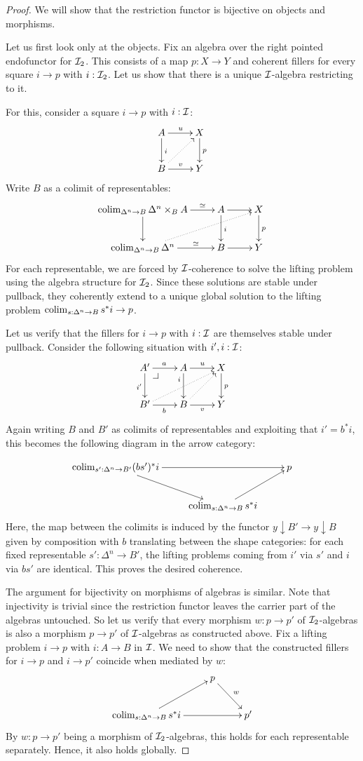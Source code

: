 \documentclass[reqno,10pt,a4paper,oneside]{amsart}
\begin{document}
\begin{proof}
We will show that the restriction functor is bijective on objects and morphisms.

Let us first look only at the objects.
Fix an algebra over the right pointed endofunctor for $\cal{I}_2$.
This consists of a map $p : X \to Y$ and coherent fillers for every square $i \to p$ with $i : \cal{I}_2$.
Let us show that there is a unique $\cal{I}$-algebra restricting to it.

For this, consider a square $i \to p$ with $i : \cal{I}$:
\[
\xymatrix{
  A
  \ar[r]^{u}
  \ar[d]^{i}
&
  X
  \ar[d]^{p}
\\
  B
  \ar[r]^{v}
  \ar@{.>}[ur]
&
  Y
}
\]
Write $B$ as a colimit of representables:
\[
\xymatrix{
  \colim_{\Delta^n \to B} \Delta^n \times_B A
  \ar[r]^-{\simeq}
  \ar[d]
&
  A
  \ar[r]
  \ar[d]^{i}
&
  X
  \ar[d]^{p}
\\
  \colim_{\Delta^n \to B} \Delta^n
  \ar[r]^-{\simeq}
  \ar@{.>}[urr]
&
  B
  \ar[r]
&
  Y
}
\]
For each representable, we are forced by $\cal{I}$-coherence to solve the lifting problem using the algebra structure for $\cal{I}_2$.
Since these solutions are stable under pullback, they coherently extend to a unique global solution to the lifting problem $\colim_{s : \Delta^n \to B} s^* i \to p$.

Let us verify that the fillers for $i \to p$ with $i : \cal{I}$ are themselves stable under pullback.
Consider the following situation with $i', i : \cal{I}$:
\[
\xymatrix{
  A'
  \ar[r]^{a}
  \ar[d]_{i'}
  \pullback{dr}
&
  A
  \ar[r]^{u}
  \ar[d]_(0.3){i}
&
  X
  \ar[d]^{p}
\\
  B'
  \ar[r]_{b}
  \ar@{.>}[urr]
&
  B
  \ar[r]_{v}
  \ar@{.>}[ur]
&
  Y
}
\]
Again writing $B$ and $B'$ as colimits of representables and exploiting that $i' = b^* i$, this becomes the following diagram in the arrow category:

\[
\xymatrix{
  \colim_{s' : \Delta^n \to B'} (bs')^* i
  \ar[rr]
  \ar[dr]
&&
  p
\\&
  \colim_{s : \Delta^n \to B} s^* i
  \ar[ur]
}
\]
Here, the map between the colimits is induced by the functor $y \downarrow B' \to y \downarrow B$ given by composition with $b$ translating between the shape categories: for each fixed representable $s' : \Delta^n \to B'$, the lifting problems coming from $i'$ via $s'$ and $i$ via $bs'$ are identical.
This proves the desired coherence.

The argument for bijectivity on morphisms of algebras is similar.
Note that injectivity is trivial since the restriction functor leaves the carrier part of the algebras untouched.
So let us verify that every morphism $w : p \to p'$ of $\cal{I}_2$-algebras is also a morphism $p \to p'$ of $\cal{I}$-algebras as constructed above.
Fix a lifting problem $i \to p$ with $i : A \to B$ in $\cal{I}$.
We need to show that the constructed fillers for $i \to p$ and $i \to p'$ coincide when mediated by $w$:
\[
\xymatrix{
&
  p
  \ar[dr]^{w}
\\
  \colim_{s : \Delta^n \to B} s^* i
  \ar[ur]
  \ar[rr]
&&
  p'
}
\]
By $w : p \to p'$ being a morphism of $\cal{I}_2$-algebras, this holds for each representable separately.
Hence, it also holds globally.
\end{proof}
\end{document}
